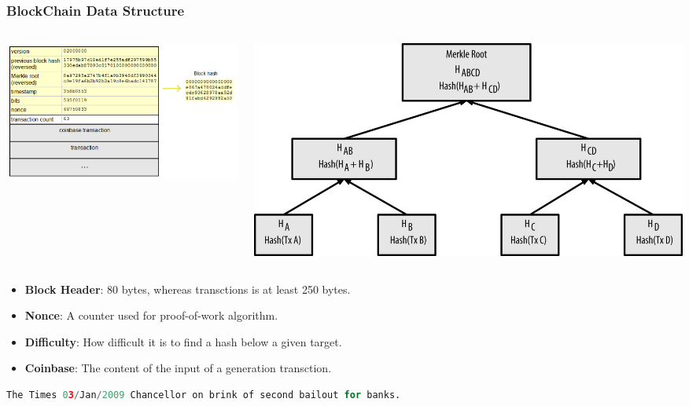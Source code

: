 \begin{frame}[fragile]
    \frametitle{BlockChain Data Structure}
    \begin{columns}
        \begin{column}{0.6\textwidth}
            \includegraphics[scale=0.5]{./figures/blockchain-data-structure.png}
        \end{column}
        \begin{column}{0.4\textwidth}
            \includegraphics[scale=0.4]{./figures/mbc2_0902.png}
        \end{column}
    \end{columns}
    \begin{itemize}
        \item \textbf{Block Header}: 80 bytes, whereas transctions is at least 250 bytes.
        \item \textbf{Nonce}: A counter used for proof-of-work algorithm.
        \item \textbf{Difficulty}: How difficult it is to find a hash below a given target.
        \item \textbf{Coinbase}: The content of the \alert{input} of a generation transction.
    \end{itemize}
    \begin{lstlisting}[language=Python]
The Times 03/Jan/2009 Chancellor on brink of second bailout for banks. \end{lstlisting}
\end{frame}

